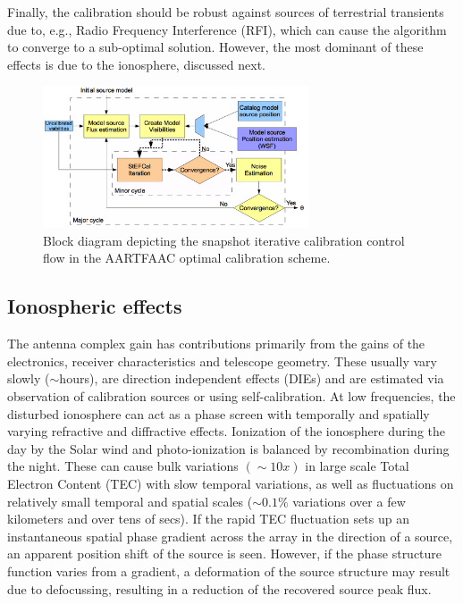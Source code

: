 \documentclass{aa}
\begin{document}
Finally,  the  calibration  should  be  robust against  sources  of  terrestrial
transients due to, e.g., Radio Frequency Interference (RFI), which can cause the
algorithm to converge to a  sub-optimal solution.  However, the most dominant of
these effects is due to the ionosphere, discussed next.

\begin{figure}[tbh]
\centering
\includegraphics[width=0.7\textwidth]{Figs/Fig2_blkdiag.png}
\caption{Block diagram depicting the snapshot
iterative calibration control flow in the AARTFAAC optimal calibration
scheme. }
\label{fig:Block-diagram-depicting}
\end{figure}

\subsection{\label{sub:All-Sky-cal-iono}Ionospheric effects}

The  antenna complex  gain has  contributions primarily  from the  gains  of the
electronics, receiver characteristics and telescope geometry. These usually vary
slowly ($\sim$hours), are direction independent effects (DIEs) and are estimated
via  observation  of calibration  sources  or  using  self-calibration.  At  low
frequencies, the disturbed ionosphere can  act as a phase screen with temporally
and  spatially varying  refractive and  diffractive effects.  Ionization  of the
ionosphere during the day by the  Solar wind and photo-ionization is balanced by
recombination   during   the   night.    These   can   cause   bulk   variations
$\left(\sim10x\right)$  in large scale  Total Electron  Content (TEC)  with slow
temporal variations,  as well as  fluctuations on relatively small  temporal and
spatial scales  ($\sim0.1\%$ variations  over a few  kilometers and over  tens of
secs).   If the rapid  TEC fluctuation  sets up  an instantaneous  spatial phase
gradient across  the array in  the direction of  a source, an  apparent position
shift of  the source is seen.   However, if the phase  structure function varies
from  a gradient,  a  deformation of  the  source structure  may  result due  to
defocussing, resulting in a reduction of the recovered source peak flux.
\end{document}
